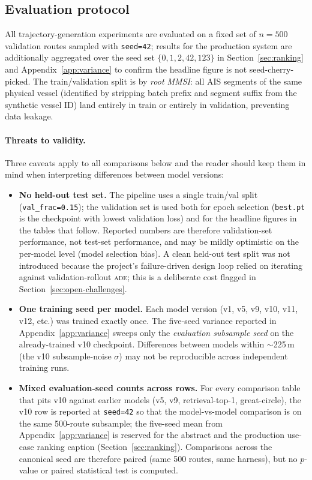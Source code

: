 \documentclass[11pt,a4paper]{article}
\newcommand{\ade}{\textsc{ade}}
\begin{document}
\subsection{Evaluation protocol}

All trajectory-generation experiments are evaluated on a fixed set of
$n=500$ validation routes sampled with \texttt{seed=42}; results for the
production system are additionally aggregated over the seed set
$\{0,1,2,42,123\}$ in Section~\ref{sec:ranking} and
Appendix~\ref{app:variance} to confirm the headline figure is not
seed-cherry-picked.
The train/validation split is by \emph{root MMSI}: all AIS segments of the
same physical vessel (identified by stripping batch prefix and segment suffix
from the synthetic vessel ID) land entirely in train or entirely in validation,
preventing data leakage.

\paragraph{Threats to validity.} Three caveats apply to all comparisons below
and the reader should keep them in mind when interpreting differences between
model versions:
\begin{itemize}
  \item \textbf{No held-out test set.} The pipeline uses a single train/val
        split (\texttt{val\_frac=0.15}); the validation set is used both for
        epoch selection (\texttt{best.pt} is the checkpoint with lowest
        validation loss) and for the headline figures in the tables that
        follow. Reported numbers are therefore validation-set performance,
        not test-set performance, and may be mildly optimistic on the
        per-model level (model selection bias). A clean held-out test split
        was not introduced because the project's failure-driven design loop
        relied on iterating against validation-rollout \ade{}; this is a
        deliberate cost flagged in Section~\ref{sec:open-challenges}.
  \item \textbf{One training seed per model.} Each model version (v1, v5,
        v9, v10, v11, v12, etc.) was trained exactly once. The five-seed
        variance reported in Appendix~\ref{app:variance} sweeps only the
        \emph{evaluation subsample seed} on the already-trained v10
        checkpoint. Differences between models within $\sim$225\,m
        (the v10 subsample-noise $\sigma$) may not be reproducible across
        independent training runs.
  \item \textbf{Mixed evaluation-seed counts across rows.}
        For every comparison table that pits v10 against earlier models
        (v5, v9, retrieval-top-1, great-circle), the v10 row is reported at
        \texttt{seed=42} so that the model-vs-model comparison is on the same
        500-route subsample; the five-seed mean from
        Appendix~\ref{app:variance} is reserved for the abstract and the
        production use-case ranking caption (Section~\ref{sec:ranking}).
        Comparisons across the canonical seed are therefore paired (same 500
        routes, same harness), but no $p$-value or paired statistical test
        is computed.
\end{itemize}
\end{document}

